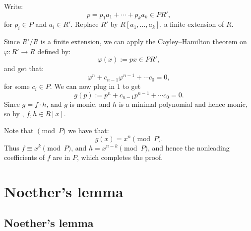 \documentclass[11pt,a4paper]{article}
\begin{document}
\begin{proofof}{}
  Write:
  \[
    p = p_1 a_1 + \cdots + p_k a_k \in P R',
  \]
  for $p_i \in P$ and $a_i \in R'$.
  Replace $R'$ by $R[a_1,\dots,a_k]$,
  a finite extension of $R$.
  
  Since $R'/R$ is a finite extension,
  we can apply the Cayley--Hamilton theorem on
  $\varphi \colon R' \to R$ defined by:
  \[
    \varphi(x) := px \in P R',
  \]
  and get that:
  \[
    \varphi^n + c_{n-1} \varphi^{n-1} + \cdots c_0 = 0,
  \]
  for some $c_i \in P$.
  We can now plug in $1$ to get
  \[
    g(p) :=
    p^n + c_{n-1} p^{n-1} + \cdots c_0 = 0.
  \]
  Since $g = f \cdot h$, and $g$ is monic,
  and $h$ is a minimal polynomial and hence monic,
  so by , $f,h \in R[x]$.

  Note that $\pmod{P}$ we have that:
  \[
    g(x) = x^n \pmod{P}.
  \]
  Thus $f \equiv x^k \pmod{P}$, and $h = x^{n-k} \pmod{P}$,
  and hence the nonleading coefficients of $f$ are in $P$,
  which completes the proof.
\end{proofof}

\newpage

\section{Noether's lemma}
\subsection{Noether's lemma}
\end{document}
